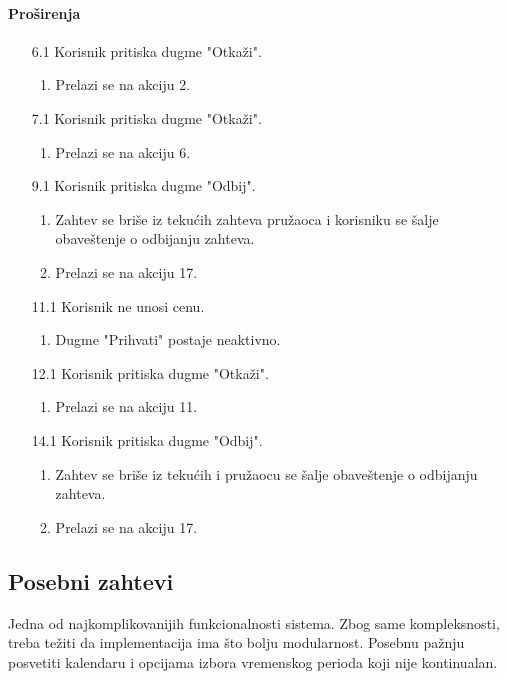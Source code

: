 \documentclass[a4paper,12pt]{report}
\begin{document}
			\paragraph*{Proširenja}
				\begin{enumerate}
					\item[6.1] Korisnik pritiska dugme "Otkaži".
						\begin{enumerate}[noitemsep,topsep=-8pt]
							\item Prelazi se na akciju 2.
						\end{enumerate}
					\item[7.1] Korisnik pritiska dugme "Otkaži".
						\begin{enumerate}[noitemsep,topsep=-8pt]
							\item Prelazi se na akciju 6.
						\end{enumerate}
					\item[9.1] Korisnik pritiska dugme "Odbij".
						\begin{enumerate}[noitemsep,topsep=-8pt]
							\item Zahtev se briše iz tekućih zahteva pružaoca i korisniku se šalje obaveštenje o odbijanju zahteva.
							\item Prelazi se na akciju 17.
						\end{enumerate}
					\item[11.1] Korisnik ne unosi cenu.
						\begin{enumerate}[noitemsep,topsep=-8pt]
							\item Dugme "Prihvati" postaje neaktivno.
						\end{enumerate}
					\item[12.1] Korisnik pritiska dugme "Otkaži".
						\begin{enumerate}[noitemsep,topsep=-8pt]
							\item Prelazi se na akciju 11.
						\end{enumerate}
					\item[14.1] Korisnik pritiska dugme "Odbij".
						\begin{enumerate}[noitemsep,topsep=-8pt]
							\item Zahtev se briše iz tekućih i pružaocu se šalje obaveštenje o odbijanju zahteva.
							\item Prelazi se na akciju 17.
						\end{enumerate}
				\end{enumerate}
		\subsection{Posebni zahtevi}
		    Jedna od najkomplikovanijih funkcionalnosti sistema.
		    Zbog same kompleksnosti, treba težiti da implementacija ima što bolju modularnost.
		    Posebnu pažnju posvetiti kalendaru i opcijama izbora vremenskog perioda koji nije kontinualan.
\end{document}
